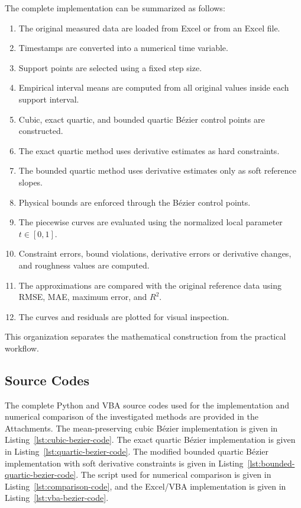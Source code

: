 \documentclass[12pt,a4paper]{article}
\begin{document}
The complete implementation can be summarized as follows:

\begin{enumerate}
    \item The original measured data are loaded from Excel or from an Excel file.
    \item Timestamps are converted into a numerical time variable.
    \item Support points are selected using a fixed step size.
    \item Empirical interval means are computed from all original values inside each support interval.
    \item Cubic, exact quartic, and bounded quartic B\'ezier control points are constructed.
    \item The exact quartic method uses derivative estimates as hard constraints.
    \item The bounded quartic method uses derivative estimates only as soft reference slopes.
    \item Physical bounds are enforced through the B\'ezier control points.
    \item The piecewise curves are evaluated using the normalized local parameter \(t\in[0,1]\).
    \item Constraint errors, bound violations, derivative errors or derivative changes, and roughness values are computed.
    \item The approximations are compared with the original reference data using RMSE, MAE, maximum error, and \(R^2\).
    \item The curves and residuals are plotted for visual inspection.
\end{enumerate}

This organization separates the mathematical construction from the practical
workflow.

\subsection{Source Codes}

The complete Python and VBA source codes used for the implementation and
numerical comparison of the investigated methods are provided in the
Attachments. The mean-preserving cubic B\'ezier implementation is given in
Listing~\ref{lst:cubic-bezier-code}. The exact quartic B\'ezier
implementation is given in Listing~\ref{lst:quartic-bezier-code}. The
modified bounded quartic B\'ezier implementation with soft derivative
constraints is given in Listing~\ref{lst:bounded-quartic-bezier-code}. The
script used for numerical comparison is given in
Listing~\ref{lst:comparison-code}, and the Excel/VBA implementation is given
in Listing~\ref{lst:vba-bezier-code}.
\end{document}
